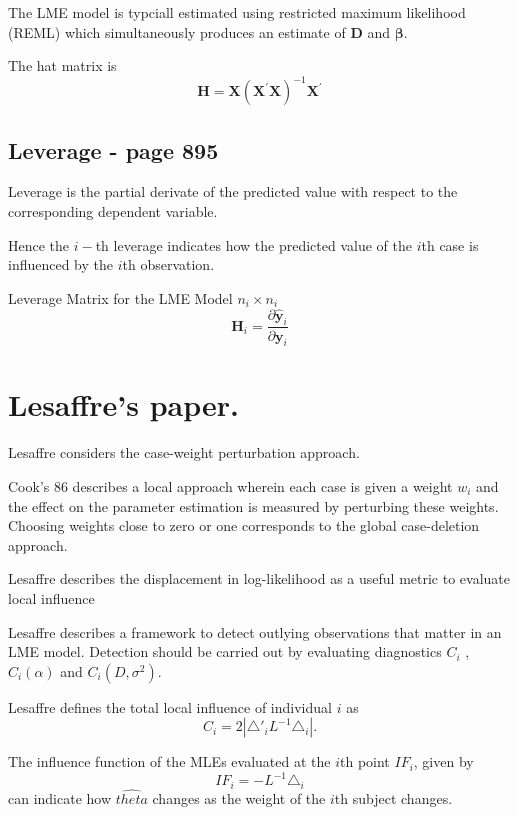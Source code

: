 \documentclass[MAIN.tex]{subfiles}
\begin{document}
The LME model is typciall estimated using restricted maximum likelihood (REML) which simultaneously produces an estimate of $\boldsymbol{D}$ and $\boldsymbol{\beta}$.

The hat matrix is 
\[\boldsymbol{H}  =  \boldsymbol{X} (\boldsymbol{X}^{\prime}\boldsymbol{X})^{-1}\boldsymbol{X} ^{\prime} \]

\subsection*{Leverage - page 895}
Leverage is the partial derivate of  the predicted value with respect to the corresponding dependent variable.

Hence the $i-$th leverage indicates how the predicted value of the $i$th case is influenced by the $i$th observation.


Leverage Matrix  for the LME Model $n_i \times n_i$
\[ \boldsymbol{H}_i = \frac{ \partial \hat{\boldsymbol{y}}_i } {\partial \boldsymbol{y}_i } \]

\section{Lesaffre's paper.} %

Lesaffre considers the case-weight perturbation approach.


Cook's 86 describes a local approach wherein each case is given a
weight $w_{i}$ and the effect on the parameter estimation is
measured by perturbing these weights. Choosing weights close to
zero or one corresponds to the global case-deletion approach.


Lesaffre  describes the displacement in log-likelihood as a useful
metric to evaluate local influence %


Lesaffre describes a framework to detect outlying observations
that matter in an LME model. Detection should be carried out by
evaluating diagnostics $C_{i}$ , $C_{i}(\alpha)$ and $C_{i}(D,
\sigma^2)$.


Lesaffre defines the total local influence of individual $i$ as
\begin{equation}
C_{i} = 2 | \triangle \prime _{i} L^{-1} \triangle_{i}|.
\end{equation}



The influence function of the MLEs evaluated at the $i$th point
$IF_{i}$, given by
\begin{equation}
IF_{i} = -L^{-1}\triangle _{i}
\end{equation}
can indicate how $\hat{theta}$ changes as the weight of the $i$th
subject changes.
\end{document}
